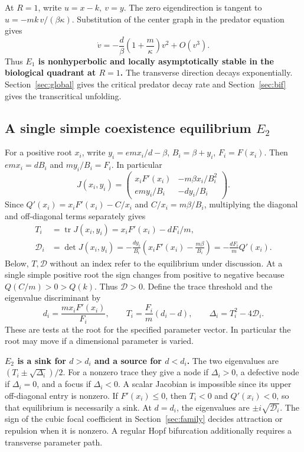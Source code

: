 \documentclass[12pt,a4paper,twoside,fleqn]{article}
\theoremstyle{journal}
\newcommand{\claim}[1]{{\normalfont\bfseries\boldmath #1}}
\newcommand{\tr}{\operatorname{tr}}
\newcommand{\Det}{\mathcal D}
\begin{document}
At \(R=1\), write \(u=x-k,\ v=y\). The zero eigendirection is tangent to \(u=-mk\,v/(\beta\kappa)\). Substitution of the center graph in the predator equation gives
\[
 \dot v=-\frac d\beta\left(1+\frac m\kappa\right)v^2+O(v^3).
\]
Thus \claim{\(E_1\) is nonhyperbolic and locally asymptotically stable in the biological quadrant at \(R=1\).} The transverse direction decays exponentially. Section~\ref{sec:global} gives the critical predator decay rate and Section~\ref{sec:bif} gives the transcritical unfolding.

\subsection{A single simple coexistence equilibrium \texorpdfstring{\(E_2\)}{E2}}\label{sec:singlelocal}
For a positive root \(x_i\), write \(y_i=emx_i/d-\beta\), \(B_i=\beta+y_i\), \(F_i=F(x_i)\). Then \(emx_i=dB_i\) and \(my_i/B_i=F_i\). In particular
\[
 J(x_i,y_i)=\begin{pmatrix}
 x_iF'(x_i)&-m\beta x_i/B_i^2\\ emy_i/B_i&-dy_i/B_i
 \end{pmatrix}.
\]
Since \(Q'(x_i)=x_iF'(x_i)-C/x_i\) and \(C/x_i=m\beta/B_i\), multiplying the diagonal and off-diagonal terms separately gives
\begin{equation}\label{eq:TD}
 \begin{aligned}
 T_i&=\tr J(x_i,y_i)=x_iF'(x_i)-dF_i/m,\\
 \Det_i&=\det J(x_i,y_i)
       =-\frac{dy_i}{B_i}\left(x_iF'(x_i)-\frac{m\beta}{B_i}\right)
       =-\frac{dF_i}{m}Q'(x_i).
 \end{aligned}
\end{equation}
Below, \(T,\Det\) without an index refer to the equilibrium under discussion. At a single simple positive root the sign changes from positive to negative because \(Q(C/m)>0>Q(k)\). Thus \(\Det>0\). Define the trace threshold and the eigenvalue discriminant by
\[
 d_i=\frac{m x_iF'(x_i)}{F_i},\qquad
 T_i=\frac{F_i}{m}(d_i-d),\qquad
 \Delta_i=T_i^2-4\Det_i .
\]
These are tests at the root for the specified parameter vector. In particular the root may move if a dimensional parameter is varied.

\claim{\(E_2\) is a sink for \(d>d_i\) and a source for \(d<d_i\).} The two eigenvalues are \((T_i\pm\sqrt{\Delta_i})/2\). For a nonzero trace they give a node if \(\Delta_i>0\), a defective node if \(\Delta_i=0\), and a focus if \(\Delta_i<0\). A scalar Jacobian is impossible since its upper off-diagonal entry is nonzero. If \(F'(x_i)\le0\), then \(T_i<0\) and \(Q'(x_i)<0\), so that equilibrium is necessarily a sink. At \(d=d_i\), the eigenvalues are \(\pm i\sqrt{\Det_i}\). The sign of the cubic focal coefficient in Section~\ref{sec:family} decides attraction or repulsion when it is nonzero. A regular Hopf bifurcation additionally requires a transverse parameter path.
\end{document}
